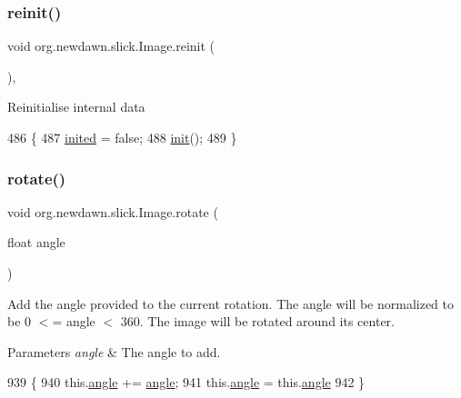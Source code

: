 \subsubsection{\texorpdfstring{reinit()}{reinit()}}
{\footnotesize\ttfamily void org.\+newdawn.\+slick.\+Image.\+reinit (\begin{DoxyParamCaption}{ }\end{DoxyParamCaption})\hspace{0.3cm}{\ttfamily [inline]}, {\ttfamily [protected]}}

Reinitialise internal data 
\begin{DoxyCode}
486                             \{
487         \mbox{\hyperlink{classorg_1_1newdawn_1_1slick_1_1_image_aa694324d7d8b46bbe65e066ca29cecfb}{inited}} = \textcolor{keyword}{false};
488         \mbox{\hyperlink{classorg_1_1newdawn_1_1slick_1_1_image_a94d180c9218ba1444a0496a1898ec345}{init}}();
489     \}
\end{DoxyCode}
\mbox{\label{classorg_1_1newdawn_1_1slick_1_1_image_ad05979099b2373502fab3228f280e4d1}} 
\subsubsection{\texorpdfstring{rotate()}{rotate()}}
{\footnotesize\ttfamily void org.\+newdawn.\+slick.\+Image.\+rotate (\begin{DoxyParamCaption}\item[{float}]{angle }\end{DoxyParamCaption})\hspace{0.3cm}{\ttfamily [inline]}}

Add the angle provided to the current rotation. The angle will be normalized to be 0 $<$= angle $<$ 360. The image will be rotated around its center.


\begin{DoxyParams}{Parameters}
{\em angle} & The angle to add. \\
\hline
\end{DoxyParams}

\begin{DoxyCode}
939                                     \{ 
940         this.\mbox{\hyperlink{classorg_1_1newdawn_1_1slick_1_1_image_a4076b08a44e95eba2b65075342f16070}{angle}} += \mbox{\hyperlink{classorg_1_1newdawn_1_1slick_1_1_image_a4076b08a44e95eba2b65075342f16070}{angle}};
941         this.\mbox{\hyperlink{classorg_1_1newdawn_1_1slick_1_1_image_a4076b08a44e95eba2b65075342f16070}{angle}} = this.\mbox{\hyperlink{classorg_1_1newdawn_1_1slick_1_1_image_a4076b08a44e95eba2b65075342f16070}{angle}} %
942     \} 
\end{DoxyCode}
\mbox{\label{classorg_1_1newdawn_1_1slick_1_1_image_ad89670cd9f6ee4cdf1d084383252be45}} 
